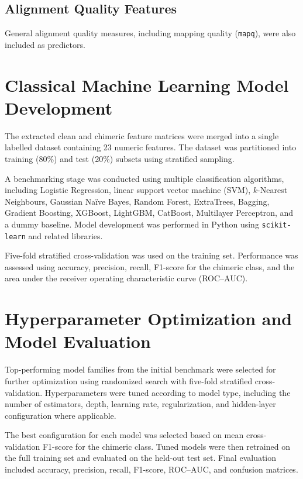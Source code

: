 \subsection{Alignment Quality Features}

General alignment quality measures, including mapping quality (\texttt{mapq}), were also included as predictors.

\section{Classical Machine Learning Model Development}

The extracted clean and chimeric feature matrices were merged into a single labelled dataset containing 23 numeric features. The dataset was partitioned into training (80\%) and test (20\%) subsets using stratified sampling.

A benchmarking stage was conducted using multiple classification algorithms, including Logistic Regression, linear support vector machine (SVM), \(k\)-Nearest Neighbours, Gaussian Na\"ive Bayes, Random Forest, ExtraTrees, Bagging, Gradient Boosting, XGBoost, LightGBM, CatBoost, Multilayer Perceptron, and a dummy baseline. Model development was performed in Python using \texttt{scikit-learn} and related libraries.

Five-fold stratified cross-validation was used on the training set. Performance was assessed using accuracy, precision, recall, F1-score for the chimeric class, and the area under the receiver operating characteristic curve (ROC--AUC).

\section{Hyperparameter Optimization and Model Evaluation}

Top-performing model families from the initial benchmark were selected for further optimization using randomized search with five-fold stratified cross-validation. Hyperparameters were tuned according to model type, including the number of estimators, depth, learning rate, regularization, and hidden-layer configuration where applicable.

The best configuration for each model was selected based on mean cross-validation F1-score for the chimeric class. Tuned models were then retrained on the full training set and evaluated on the held-out test set. Final evaluation included accuracy, precision, recall, F1-score, ROC--AUC, and confusion matrices.


